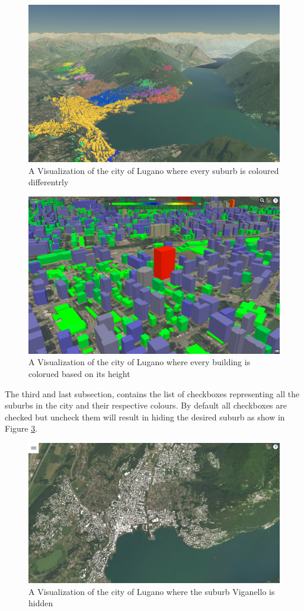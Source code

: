 \begin{figure} [H]
\centering
\includegraphics[width=.8\textwidth]{chapter4/images/application_bySuburb}
\caption{A Visualization of the city of Lugano where every suburb is coloured differentrly}
\label{fig:application_bySuburb}
\end{figure}
\begin{figure} [H]
\centering
\includegraphics[width=.8\textwidth]{chapter4/images/application_byHeight}
\caption{A Visualization of the city of Lugano where every building is colorued based on its height}
\label{fig:application_byHeight}
\end{figure}
The third and last subsection, contains the list of checkboxes representing all the suburbs in the city and their respective colours. By default all checkboxes are checked but uncheck them will result in hiding the desired suburb as show in Figure \ref{fig:application_showSuburb}.
\begin{figure} [H]
\centering
\includegraphics[width=.8\textwidth]{chapter4/images/application_showSuburb}
\caption{A Visualization of the city of Lugano where the suburb Viganello is hidden}
\label{fig:application_showSuburb}
\end{figure}

